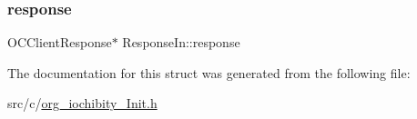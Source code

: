 \hypertarget{struct_response_in_a7be6abf5b2ddd25305851bc4f5248755}{}\label{struct_response_in_a7be6abf5b2ddd25305851bc4f5248755} 
\subsubsection{\texorpdfstring{response}{response}}
{\footnotesize\ttfamily O\+C\+Client\+Response$\ast$ Response\+In\+::response}



The documentation for this struct was generated from the following file\+:\begin{DoxyCompactItemize}
\item 
src/c/\hyperlink{org__iochibity___init_8h}{org\+\_\+iochibity\+\_\+\+Init.\+h}\end{DoxyCompactItemize}
